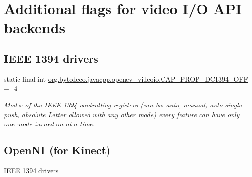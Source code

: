 \hypertarget{group__videoio__flags__others}{}\section{Additional flags for video I/O A\+PI backends}
\label{group__videoio__flags__others}
\subsection*{I\+E\+EE 1394 drivers}
\begin{DoxyCompactItemize}
\item 
static final int \hyperlink{group__videoio__flags__others_gad6592d7bfce8b9138f5a334ae87a5ff9}{org.\+bytedeco.\+javacpp.\+opencv\+\_\+videoio.\+C\+A\+P\+\_\+\+P\+R\+O\+P\+\_\+\+D\+C1394\+\_\+\+O\+FF} = -\/4
\begin{DoxyCompactList}\small\item\em Modes of the I\+E\+EE 1394 controlling registers (can be\+: auto, manual, auto single push, absolute Latter allowed with any other mode) every feature can have only one mode turned on at a time. \end{DoxyCompactList}\end{DoxyCompactItemize}
\subsection*{Open\+NI (for Kinect)}
\label{_amgrp848bd3907cdb4b9cd483b8d19dbc52c3}%
 I\+E\+EE 1394 drivers 

